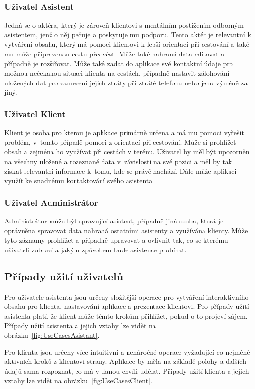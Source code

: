 \documentclass[czech,master,public,dept460,male,java,cpdeclaration]{diploma}
\begin{document}
\subsubsection{Uživatel Asistent}
Jedná se o aktéra, který je zároveň klientovi s mentálním postižením odborným asistentem,
jenž o něj pečuje a poskytuje mu podporu. Tento aktér je relevantní k vytváření obsahu,
který má pomoci klientovi k lepší orientaci při cestování a také mu může připravenou
cestu předvést. Může také nahraná data editovat a případně je rozšiřovat. Může také zadat
do aplikace své kontaktní údaje pro možnou nečekanou situaci klienta na cestách, případně
nastavit zálohování uložených dat pro zamezení jejich ztráty při ztrátě telefonu nebo jeho výměně
za jiný.

\subsubsection{Uživatel Klient}
Klient je osoba pro kterou je aplikace primárně určena a má mu pomoci vyřešit problém,
v~tomto případě pomoci z orientací při cestování. Může si prohlížet obsah a zejména ho
využívat při cestách v terénu. Uživatel by měl být upozorněn na všechny uložené a rozeznané
data v~závislosti na své pozici a měl by tak získat relevantní informace k~tomu, kde se právě
nachází. Dále může aplikaci využít ke snadnému kontaktování svého asistenta.


\subsubsection{Uživatel Administrátor}
Administrátor může být spravující asistent, případně jiná osoba, která je oprávněna spravovat
data nahraná ostatními asistenty a využívána klienty. Může tyto záznamy prohlížet a případně
 upravovat a ovlivnit tak, co se kterému uživateli zobrazí a jakým způsobem bude asistence probíhat.


\subsection{Případy užití uživatelů}
Pro uživatele asistenta jsou určeny složitější operace pro vytváření interaktivního obsahu pro klienta,
nastavování aplikace a prezentace klientovi. Pro případy užití asistenta platí, že klient může těmto
krokům přihlížet, pokud o to projeví zájem. Případy užití asistenta a jejich vztahy lze vidět na obrázku~\ref{fig:UseCasesAsistant}.

Pro klienta jsou určeny více intuitivní a nenáročné operace vyžadující co nejméně aktivních
kroků z klientovi strany. Aplikace by měla na základě polohy a dalších údajů sama rozpoznat,
co má v danou chvíli udělat. Případy užití klienta a jejich vztahy lze vidět na obrázku~\ref{fig:UseCasesClient}.
\end{document}
